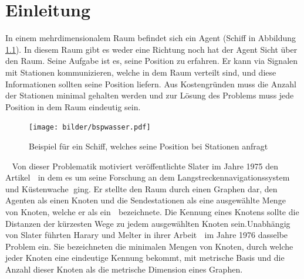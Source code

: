 



\chapter{Einleitung}
\vspace{-3mm}
In einem mehrdimensionalem Raum befindet sich ein Agent (Schiff in Abbildung \ref{schiff}). In diesem Raum gibt es weder eine Richtung noch hat der Agent Sicht über den Raum. Seine Aufgabe ist es, seine Position zu erfahren. Er kann via Signalen mit Stationen kommunizieren, welche in dem Raum verteilt sind, und diese Informationen sollten seine Position liefern. Aus Kostengründen muss die Anzahl der Stationen minimal gehalten werden und zur Lösung des Problems muss jede Position in dem Raum eindeutig sein.\newline\newline 
\vspace{-14mm}
\newline
\begin{figure}[h]
\centering
\texttt{[image: bilder/bspwasser.pdf]}
\caption{Beispiel für ein Schiff, welches seine Position bei Stationen anfragt}
\label{schiff}
\end{figure}
\vspace{-4mm}
~\linebreak
Von dieser Problematik motiviert veröffentlichte Slater im Jahre 1975 den Artikel \grqq$\;$\cite{slater} in dem es um seine Forschung an dem Langstreckennavigationssystem \grqq$\;$und Küstenwache \grqq$\;$ging. Er stellte den Raum durch einen Graphen dar, den Agenten als einen Knoten und die Sendestationen als eine ausgewählte Menge von Knoten, welche er als ein \grqq$\;$ bezeichnete. Die Kennung eines Knotens sollte die Distanzen der kürzesten Wege zu jedem ausgewählten Knoten sein.\vspace{-1mm}\newline\newline Unabhängig von Slater führten Harary und Melter in ihrer Arbeit \grqq$\;$\cite{harary} im Jahre 1976 dasselbe Problem ein. Sie bezeichneten die minimalen Mengen von Knoten, durch welche jeder Knoten eine eindeutige Kennung bekommt, mit metrische Basis und die Anzahl dieser Knoten als die metrische Dimension eines Graphen.\vspace{-2mm}\newline\newline
